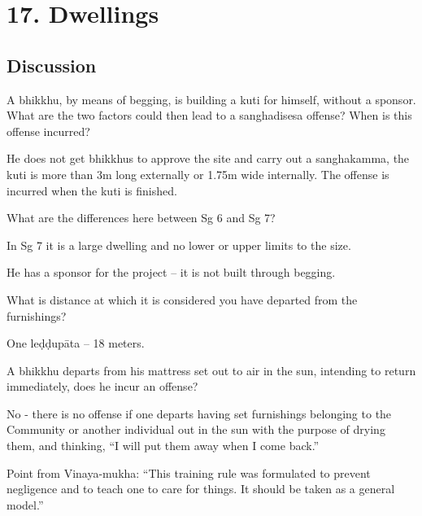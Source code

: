 \chapter{17. Dwellings}
\renewcommand*{\theChapterTitle}{17. Dwellings}

\section*{Discussion}


A bhikkhu, by means of begging, is building a kuti for himself, without a
sponsor. What are the two factors could then lead to a sanghadisesa offense?
When is this offense incurred?

\begin{solution}
  He does not get bhikkhus to approve the site and carry out a sanghakamma, the
  kuti is more than 3m long externally or 1.75m wide internally. The offense is
  incurred when the kuti is finished.
\end{solution}

\bigskip


What are the differences here between Sg 6 and Sg 7?

\begin{solution}
  In Sg 7 it is a large dwelling and no lower or upper limits to the size.

  He has a sponsor for the project – it is not built through begging. 
\end{solution}

\bigskip


What is distance at which it is considered you have departed from the furnishings?

\begin{solution}
  One leḍḍupāta -- 18 meters.
\end{solution}

\bigskip

A bhikkhu departs from his mattress set out to air in the sun, intending to
return immediately, does he incur an offense?

\begin{solution}
  No - there is no offense if one departs having set furnishings belonging to
  the Community or another individual out in the sun with the purpose of drying
  them, and thinking, “I will put them away when I come back.”

  Point from Vinaya-mukha: “This training rule was formulated to prevent
  negligence and to teach one to care for things. It should be taken as a
  general model.”
\end{solution}

